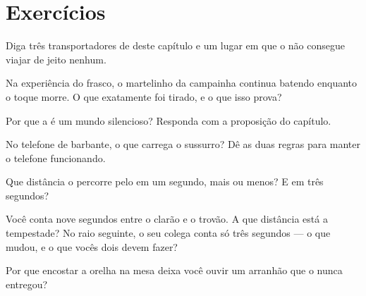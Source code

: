 \section{Exercícios}

\begin{exercise}[$\star$]\label{exo:g4:how-sound-travels:1}
Diga três transportadores de  deste capítulo e um lugar em que o
 não consegue viajar de jeito nenhum.
\end{exercise}

\begin{exercise}[$\star$]\label{exo:g4:how-sound-travels:2}
Na experiência do frasco, o martelinho da campainha continua batendo
enquanto o toque morre. O que exatamente foi tirado, e o que isso
prova?
\end{exercise}

\begin{exercise}[$\star$]\label{exo:g4:how-sound-travels:3}
Por que a  é um mundo silencioso? Responda com a proposição do
capítulo.
\end{exercise}

\begin{exercise}[$\star$]\label{exo:g4:how-sound-travels:4}
No telefone de barbante, o que carrega o sussurro? Dê as duas regras
para manter o telefone funcionando.
\end{exercise}

\begin{exercise}[$\star$]\label{exo:g4:how-sound-travels:5}
Que distância o  percorre pelo  em um segundo, mais ou menos? E
em três segundos?
\end{exercise}

\begin{exercise}[$\star$]\label{exo:g4:how-sound-travels:6}
Você conta nove segundos entre o clarão e o trovão. A que distância
está a tempestade? No raio seguinte, o seu colega conta só três
segundos --- o que mudou, e o que vocês dois devem fazer?
\end{exercise}

\begin{exercise}[$\star$]\label{exo:g4:how-sound-travels:7}
Por que encostar a orelha na mesa deixa você ouvir um arranhão que o
 nunca entregou?
\end{exercise}

